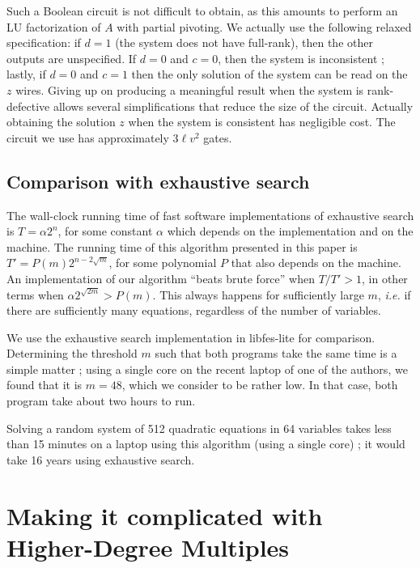 \documentclass[a4paper,UKenglish,cleveref, autoref]{lipics-v2019}
\begin{document}
  Such a Boolean circuit is not difficult to obtain, as this amounts to perform an
  LU factorization of $A$ with partial pivoting.  We actually use the following
  relaxed specification: if $d=1$ (the system does not have full-rank), then the
  other outputs are unspecified. If $d=0$ and $c=0$, then the system is
  inconsistent ; lastly, if $d=0$ and $c=1$ then the only solution of the system
  can be read on the $z$ wires. Giving up on producing a meaningful result when
  the system is rank-defective allows several simplifications that reduce the size
  of the circuit. Actually obtaining the solution $z$ when the system is
  consistent has negligible cost. The circuit we use has approximately $3\ell v^2$
  gates.
  
  \subsection{Comparison with exhaustive search}
  
  The wall-clock running time of fast software implementations of exhaustive
  search is $T = \alpha 2^n$, for some constant $\alpha$ which depends on the
  implementation and on the machine. The running time of this algorithm presented
  in this paper is $T' = P(m) 2^{n - 2\sqrt{m}}$, for some polynomial $P$ that
  also depends on the machine. An implementation of our algorithm ``beats brute
  force'' when $T/T' > 1$, in other terms when
  $\alpha 2^{\sqrt{2m}} > P(m)$. This always happens for sufficiently large
  $m$, \textit{i.e.} if there are sufficiently many equations, regardless of the
  number of variables.
  
  We use the exhaustive search implementation in \textsf{libfes-lite} for
  comparison. Determining the threshold $m$ such that both programs take the same
  time is a simple matter ; using a single core on the recent laptop of one of the
  authors, we found that it is $m=48$, which we consider to be rather low. In that
  case, both program take about two hours to run.
  
  Solving a random system of 512 quadratic equations in 64 variables takes less
  than 15 minutes on a laptop using this algorithm (using a single core) ; it
  would take 16 years using exhaustive search.
  
  
  \section{Making it complicated with Higher-Degree Multiples}
  \label{sec:extensions}
  
\end{document}
